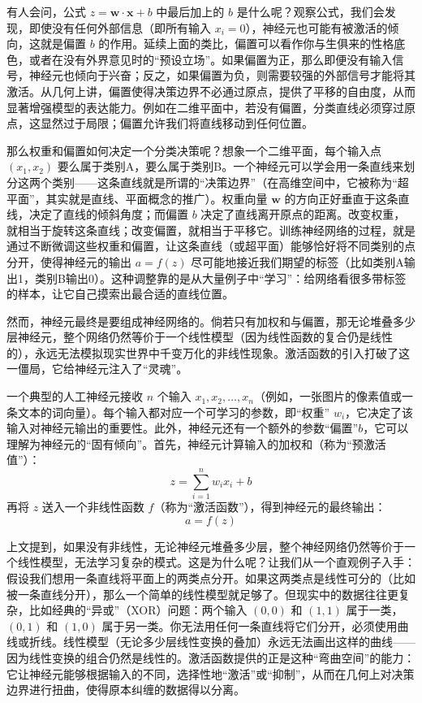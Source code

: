 \documentclass[lang=cn,zihao=-4,a4paper,fontset=windows]{beautybook}
\begin{document}
有人会问，公式 \(z = \mathbf{w} \cdot \mathbf{x} + b\) 中最后加上的 \(b\) 是什么呢？观察公式，我们会发现，即使没有任何外部信息（即所有输入 \(x_i = 0\)），神经元也可能有被激活的倾向，这就是偏置 \(b\) 的作用。延续上面的类比，偏置可以看作你与生俱来的性格底色，或者在没有外界意见时的“预设立场”。如果偏置为正，那么即便没有输入信号，神经元也倾向于兴奋；反之，如果偏置为负，则需要较强的外部信号才能将其激活。从几何上讲，偏置使得决策边界不必通过原点，提供了平移的自由度，从而显著增强模型的表达能力。例如在二维平面中，若没有偏置，分类直线必须穿过原点，这显然过于局限；偏置允许我们将直线移动到任何位置。

那么权重和偏置如何决定一个分类决策呢？想象一个二维平面，每个输入点 $(x_1, x_2)$ 要么属于类别A，要么属于类别B。一个神经元可以学会用一条直线来划分这两个类别——这条直线就是所谓的“决策边界”（在高维空间中，它被称为“超平面”，其实就是直线、平面概念的推广）。权重向量 $\mathbf{w}$ 的方向正好垂直于这条直线，决定了直线的倾斜角度；而偏置 $b$ 决定了直线离开原点的距离。改变权重，就相当于旋转这条直线；改变偏置，就相当于平移它。训练神经网络的过程，就是通过不断微调这些权重和偏置，让这条直线（或超平面）能够恰好将不同类别的点分开，使得神经元的输出 $a = f(z)$ 尽可能地接近我们期望的标签（比如类别A输出1，类别B输出0）。这种调整靠的是从大量例子中“学习”：给网络看很多带标签的样本，让它自己摸索出最合适的直线位置。

然而，神经元最终是要组成神经网络的。倘若只有加权和与偏置，那无论堆叠多少层神经元，整个网络仍然等价于一个线性模型（因为线性函数的复合仍是线性的），永远无法模拟现实世界中千变万化的非线性现象。激活函数的引入打破了这一僵局，它给神经元注入了“灵魂”。

\begin{definition}[][神经元的数学模型]
一个典型的人工神经元接收 $n$ 个输入 $x_1, x_2, \ldots, x_n$（例如，一张图片的像素值或一条文本的词向量）。每个输入都对应一个可学习的参数，即“权重” $w_i$，它决定了该输入对神经元输出的重要性。此外，神经元还有一个额外的参数“偏置”$b$，它可以理解为神经元的“固有倾向”。首先，神经元计算输入的加权和（称为“预激活值”）：
\[
z = \sum_{i=1}^{n} w_i x_i + b
\]
再将 $z$ 送入一个非线性函数 $f$（称为“激活函数”），得到神经元的最终输出：
\[
a = f(z)
\]
\end{definition}

上文提到，如果没有非线性，无论神经元堆叠多少层，整个神经网络仍然等价于一个线性模型，无法学习复杂的模式。这是为什么呢？让我们从一个直观例子入手：假设我们想用一条直线将平面上的两类点分开。如果这两类点是线性可分的（比如被一条直线分开），那么一个简单的线性模型就足够了。但现实中的数据往往更复杂，比如经典的“异或”（XOR）问题：两个输入 $(0,0)$ 和 $(1,1)$ 属于一类，$(0,1)$ 和 $(1,0)$ 属于另一类。你无法用任何一条直线将它们分开，必须使用曲线或折线。线性模型（无论多少层线性变换的叠加）永远无法画出这样的曲线——因为线性变换的组合仍然是线性的。激活函数提供的正是这种“弯曲空间”的能力：它让神经元能够根据输入的不同，选择性地“激活”或“抑制”，从而在几何上对决策边界进行扭曲，使得原本纠缠的数据得以分离。
\end{document}
